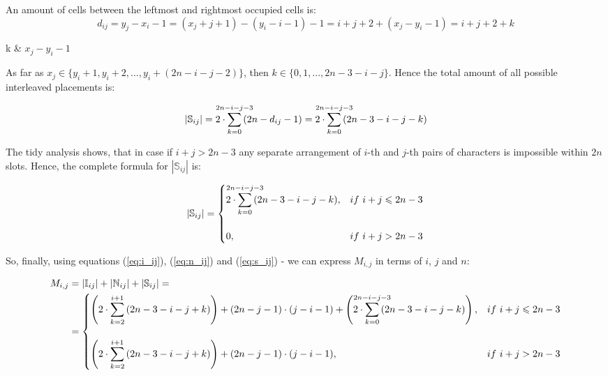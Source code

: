 \documentclass{article}
\makeatletter
\newenvironment{conditions_eq}[1][where:]
  {#1 \begin{tabular}[t]{>{$}l<{$} @{${} = {}$} l}}
  {\end{tabular}\\[\belowdisplayskip]}
\makeatother
\begin{document}
\begin{enumerate}
An amount of cells between the leftmost and rightmost occupied cells is:
\begin{equation}
d_{ij} = y_j - x_i - 1 = (x_j + j + 1) - (y_i - i - 1) - 1 = i + j + 2 + (x_j - y_i - 1) = i + j + 2 + k
\end{equation}
\begin{conditions_eq}
k &  $x_j - y_i - 1$
\end{conditions_eq}
As far as $x_j \in \{y_i + 1, y_i + 2, ... , y_i + (2n - i - j - 2) \}$, then $k \in \{0, 1, ... , 2n - 3 - i - j\}$.
Hence the total amount of all possible interleaved placements is:

\begin{equation}
\left| \mathbb{S}_{ij} \right| = 2 \cdot \smashoperator{\sum_{k = 0}^{2n - i - j - 3}}{\left( 2n - d_{ij} - 1 \right)} = 2 \cdot \smashoperator{\sum_{k = 0}^{2n - i - j - 3}}{\left( 2n - 3 - i - j - k \right)}
\end{equation}

The tidy analysis shows, that in case if $i + j > 2n - 3$ any separate arrangement of $i$-th and $j$-th pairs of characters is impossible within $2n$ slots. Hence, the complete formula for $\left| \mathbb{S}_{ij} \right|$ is:

\begin{equation} \label{eq:s_ij}
\left| \mathbb{S}_{ij} \right| = 
\begin{cases}
2 \cdot \displaystyle\smashoperator{\sum_{k = 0}^{2n - i - j - 3}}{\left( 2n - 3 - i - j - k \right)}, & if\ i + j \leqslant 2n - 3 \\
\\
0, & if\ i + j > 2n - 3
\end{cases}
\end{equation}

\end{enumerate}

So, finally, using equations (\ref{eq:i_ij}), (\ref{eq:n_ij}) and (\ref{eq:s_ij}) - we can express $M_{i,j}$ in terms of $i$, $j$ and $n$:

\begin{equation} \label{eq:m_ij}
\begin{split}
	M_{i,j} & = \left| \mathbb{I}_{ij} \right| + \left| \mathbb{N}_{ij} \right| + \left| \mathbb{S}_{ij} \right| = \\
	          & =
	\begin{cases}
		\left( 2 \cdot \displaystyle\sum_{k = 2}^{i + 1}{\left( 2n - 3 - i - j + k \right)} \right) + (2n - j - 1) \cdot (j - i - 1) + \left( 2 \cdot \displaystyle\smashoperator{\sum_{k = 0}^{2n - i - j - 3}}{\left( 2n - 3 - i - j - k \right)} \right), & if\ i + j \leqslant 2n - 3 \\
		\\
		\left( 2 \cdot \displaystyle\sum_{k = 2}^{i + 1}{\left( 2n - 3 - i - j + k \right)} \right) + (2n - j - 1) \cdot (j - i - 1), & if\ i + j > 2n - 3
	\end{cases}
\end{split}
\end{equation}
\end{document}
